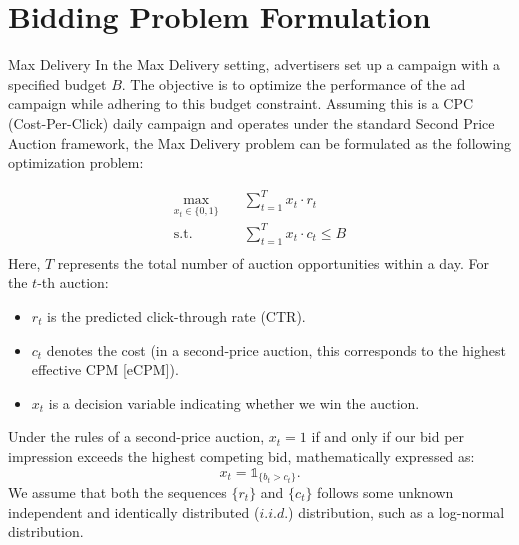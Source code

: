 \documentclass[../main.tex]{subfiles}
\begin{document}
	\chapter{Bidding Problem Formulation}
	
	
	\begin{section}{Max Delivery}
	In the Max Delivery setting, advertisers set up a campaign with a specified budget $B$. The objective is to optimize the performance of the ad campaign while adhering to this budget constraint. Assuming this is a CPC (Cost-Per-Click) daily campaign and operates under the standard Second Price Auction framework, the Max Delivery problem can be formulated as the following optimization problem:
	
		\begin{equation}  \label{eq:max_delivery}
			\begin{aligned}
				\max_{x_t \in \{0,1\}} \quad & \sum_{t=1}^T x_t \cdot r_t \\
				\text{s.t.} \quad &  \sum_{t=1}^{T} x_t \cdot c_t \leq B \\
			\end{aligned}
		\end{equation}
	Here, \(T\) represents the total number of auction opportunities within a day. For the \(t\)-th auction:
	\begin{itemize}
		\item \(r_t\) is the predicted click-through rate (CTR).
		\item \(c_t\) denotes the cost (in a second-price auction, this corresponds to the highest effective CPM [eCPM]).
		\item \(x_t\) is a decision variable indicating whether we win the auction.
	\end{itemize}
	Under the rules of a second-price auction, \(x_t = 1\) if and only if our bid per impression exceeds the highest competing bid, mathematically expressed as:
	\[
	x_t = \mathds{1}_{ \{b_t > c_t \}}.
	\]
	We assume that both the sequences \(\{r_t\}\)  and \(\{c_t\}\) follows some unknown independent and identically distributed (\(i.i.d.\)) distribution, such as a log-normal distribution.
	

\end{section}
\end{document}
